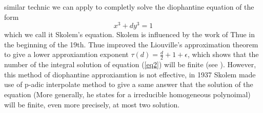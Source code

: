     similar technic we can apply to completly solve the diophantine equation of the form
    \begin{equation} \label{eq2}
        x^3+dy^3=1
    \end{equation}
    which we call it Skolem's equation. Skolem is influenced by the work of Thue in the beginning of the 19th. Thue improved the Liouville's approximation theorem to give a lower approxiamtion exponent \(\tau(d) = \frac{d}{2}+1+\epsilon\), which shows that the number of the integral solution of equation (\ref{eq2}) will be finite (see \cite[Chapter 11]{silverman2009arithmetic}). However, this method of diophantine approxiamtion is not effective, in 1937 Skolem made use of p-adic interpolate method to give a same answer that the solution of the equation (More generally, he states for a irreducible homogeneous polynoimal) will be finite, even more precisely, at most two solution.

